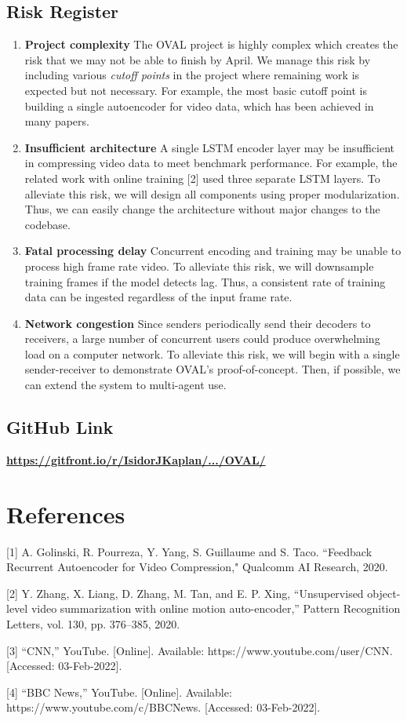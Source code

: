 \documentclass[letter, 12pt]{article}
\begin{document}
\subsection{Risk Register}

\begin{enumerate}
    \item \textbf{Project complexity     } The OVAL project is highly complex which creates the risk that we may not be able to finish by April. We manage this risk by including various \textit{cutoff points} in the project where remaining work is expected but not necessary. For example, the most basic cutoff point is building a single autoencoder for video data, which has been achieved in many papers.
    \item \textbf{Insufficient architecture     } A single LSTM encoder layer may be insufficient in compressing video data to meet benchmark performance. For example, the related work with online training [2] used three separate LSTM layers. To alleviate this risk, we will design all components using proper modularization. Thus, we can easily change the architecture without major changes to the codebase.
    \item \textbf{Fatal processing delay    }   Concurrent encoding and training may be unable to process high frame rate video. To alleviate this risk, we will downsample training frames if the model detects lag. Thus, a consistent rate of training data can be ingested regardless of the input frame rate.
    \item \textbf{Network congestion     } Since senders periodically send their decoders to receivers, a large number of concurrent users could produce overwhelming load on a computer network. To alleviate this risk, we will begin with a single sender-receiver to demonstrate OVAL's proof-of-concept. Then, if possible, we can extend the system to multi-agent use.
\end{enumerate}

\subsection{GitHub Link}

\textbf{\href{https://gitfront.io/r/IsidorJKaplan/66735f7a469e427f884c3c37717656a3ca7de0f5/OVAL/}{https://gitfront.io/r/IsidorJKaplan/.../OVAL/}}

\pagebreak

\section*{References}

[1]  A. Golinski, R. Pourreza, Y. Yang, S. Guillaume and S. Taco. ``Feedback Recurrent Autoencoder for Video Compression," Qualcomm AI Research, 2020. 

[2] Y. Zhang, X. Liang, D. Zhang, M. Tan, and E. P. Xing, ``Unsupervised object-level video summarization with online motion auto-encoder,” Pattern Recognition Letters, vol. 130, pp. 376–385, 2020. 

[3] “CNN,” YouTube. [Online]. Available: https://www.youtube.com/user/CNN. [Accessed: 03-Feb-2022]. 

[4] “BBC News,” YouTube. [Online]. Available: https://www.youtube.com/c/BBCNews. [Accessed: 03-Feb-2022]. 
\end{document}
